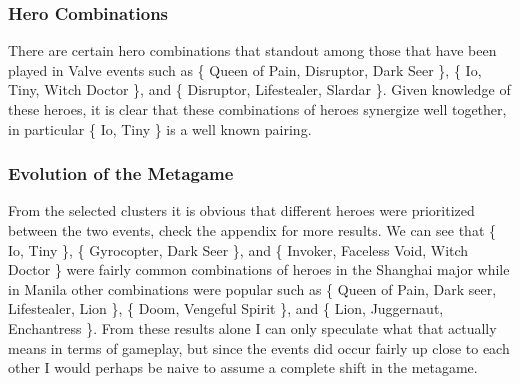 \documentclass[result.tex]{subfiles}
\begin{document}
\subsubsection*{Hero Combinations}

There are certain hero combinations that standout among those that have been played in Valve events such as \{ Queen of Pain, Disruptor, Dark Seer \}, \{ Io, Tiny, Witch Doctor \}, and  \{ Disruptor, Lifestealer, Slardar \}. Given knowledge of these heroes, it is clear that these combinations of heroes synergize well together, in particular \{ Io, Tiny \} is a well known pairing.

\subsubsection*{Evolution of the Metagame}

From the selected clusters it is obvious that different heroes were prioritized between the two events, check the appendix for more results. We can see that \{ Io, Tiny \}, \{ Gyrocopter, Dark Seer \}, and \{ Invoker, Faceless Void, Witch Doctor \} were fairly common combinations of heroes in the Shanghai major while in Manila other combinations were popular such as \{ Queen of Pain, Dark seer, Lifestealer, Lion \}, \{ Doom, Vengeful Spirit \}, and \{ Lion, Juggernaut, Enchantress \}. From these results alone I can only speculate what that actually means in terms of gameplay, but since the events did occur fairly up close to each other I would perhaps be naive to assume a complete shift in the metagame.
\end{document}
